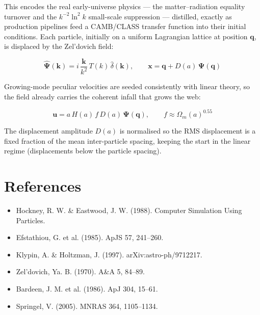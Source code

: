 This encodes the real early-universe physics --- the matter--radiation equality
turnover and the $k^{-2}\ln^2 k$ small-scale suppression --- distilled, exactly
as production pipelines feed a CAMB/CLASS transfer function into their initial
conditions. Each particle, initially on a uniform Lagrangian lattice at
position $\mathbf{q}$, is displaced by the Zel'dovich field:

\begin{equation}
\hat{\boldsymbol{\Psi}}(\mathbf{k}) = i\,\frac{\mathbf{k}}{k^2}\,T(k)\,\hat{\delta}(\mathbf{k}),
\qquad
\mathbf{x} = \mathbf{q} + D(a)\,\boldsymbol{\Psi}(\mathbf{q})
\end{equation}

Growing-mode peculiar velocities are seeded consistently with linear theory,
so the field already carries the coherent infall that grows the web:

\begin{equation}
\mathbf{u} = a\,H(a)\,f\,D(a)\,\boldsymbol{\Psi}(\mathbf{q}), \qquad
f \approx \Omega_m(a)^{0.55}
\end{equation}

The displacement amplitude $D(a)$ is normalised so the RMS displacement is a
fixed fraction of the mean inter-particle spacing, keeping the start in the
linear regime (displacements below the particle spacing).

\section{References}

\begin{itemize}
\item Hockney, R. W. \& Eastwood, J. W. (1988). Computer Simulation Using Particles.
\item Efstathiou, G. et al. (1985). ApJS 57, 241--260.
\item Klypin, A. \& Holtzman, J. (1997). arXiv:astro-ph/9712217.
\item Zel'dovich, Ya. B. (1970). A\&A 5, 84--89.
\item Bardeen, J. M. et al. (1986). ApJ 304, 15--61.
\item Springel, V. (2005). MNRAS 364, 1105--1134.
\end{itemize}
